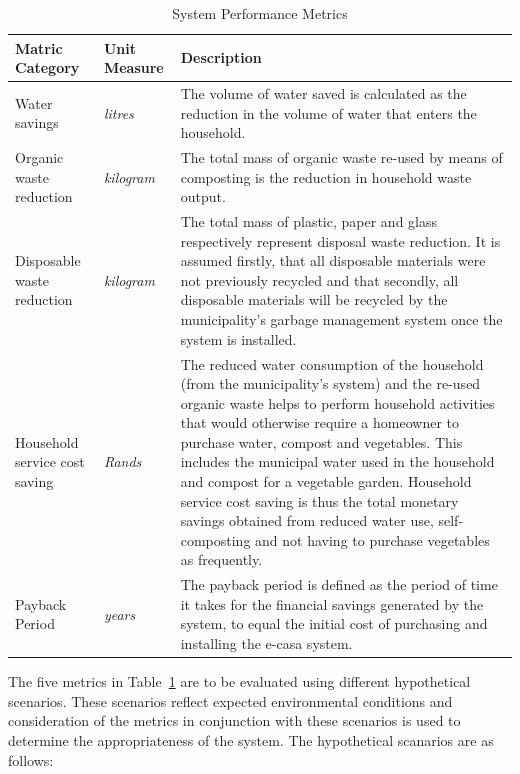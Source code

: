 \documentclass[a4paper,11pt,fleqn]{report}
\begin{document}
\begin{table}[h]
\caption {System Performance Metrics} \label{tb: Performance_Metrics} 
\begin{center}
\begin{tabular}{p{5cm}|p{3cm}|p{8cm}}\toprule
	{\textbf{Matric Category}} & {\textbf{Unit Measure}} & {\textbf{Description}}\\ \midrule
    Water savings & \textit{litres} & The volume of water saved is calculated as the reduction in the volume of water that enters the household. \\
    \hline
    Organic waste reduction & \textit{kilogram} & The total mass of organic waste re-used by means of composting is the reduction in household waste output.\\
    \hline
    Disposable waste reduction & \textit{kilogram} & The total mass of plastic, paper and glass respectively represent disposal waste reduction. It is assumed firstly, that all disposable materials were not previously recycled and that secondly, all disposable materials will be recycled by the municipality's garbage management system once the system is installed.\\
    \hline
    Household service cost saving & \textit{Rands} & The reduced water consumption of the household (from the municipality's system) and the re-used organic waste helps to perform household activities that would otherwise require a homeowner to purchase water, compost and vegetables. This includes the municipal water used in the household and compost for a vegetable garden. Household service cost saving is thus the total monetary savings obtained from reduced water use, self-composting and not having to purchase vegetables as frequently.\\
    \hline
    Payback Period & \textit{years} & The payback period is defined as the period of time it takes for the financial savings generated by the system, to equal the initial cost of purchasing and installing the \ac{e-casa} system. \\ \bottomrule
\end{tabular}
\end{center}
\end{table}

The five metrics in Table~\ref{tb: Performance_Metrics} are to be evaluated using different hypothetical scenarios. These scenarios reflect expected environmental conditions and consideration of the metrics in conjunction with these scenarios is used to determine the appropriateness of the system. The hypothetical scanarios are as follows:
\end{document}
